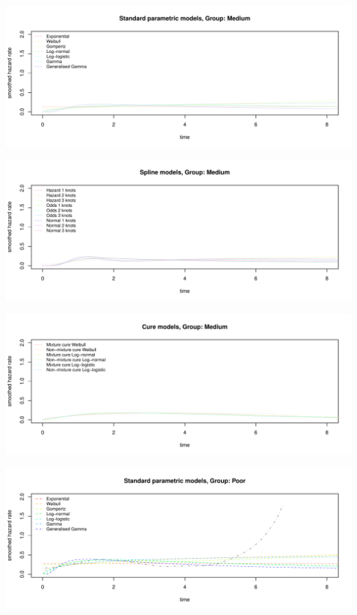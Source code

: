 \documentclass[
]{article}
\begin{document}
\begin{flushleft}\includegraphics[height=0.29\textheight]{BC_OS_output/Images/Figure_plot_haz_pred-4} \end{flushleft}

\begin{flushleft}\includegraphics[height=0.29\textheight]{BC_OS_output/Images/Figure_plot_haz_pred-5} \end{flushleft}

\begin{flushleft}\includegraphics[height=0.29\textheight]{BC_OS_output/Images/Figure_plot_haz_pred-6} \end{flushleft}

\begin{flushleft}\includegraphics[height=0.29\textheight]{BC_OS_output/Images/Figure_plot_haz_pred-7} \end{flushleft}
\end{document}
